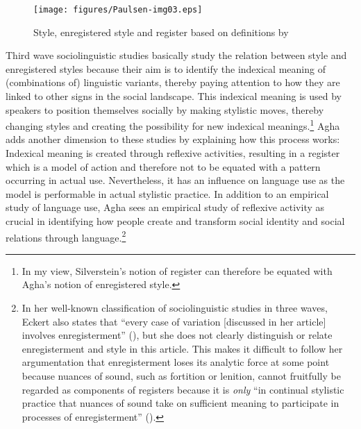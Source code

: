 

\begin{figure}
\texttt{[image: figures/Paulsen-img03.eps]}
\caption{Style, enregistered style and register based on definitions by \citet{Agha2007}}
\label{fig:2:3}
\end{figure}


Third wave sociolinguistic studies basically study the relation between style and enregistered styles because their aim is to identify the indexical meaning of (combinations of) linguistic variants, thereby paying attention to how they are linked to other signs in the social landscape. This indexical meaning is used by speakers to position themselves socially by making stylistic moves, thereby changing styles and creating the possibility for new indexical meanings.\footnote{In my view, Silverstein’s notion of register can therefore be equated with Agha’s notion of enregistered style.} Agha adds another dimension to these studies by explaining how this process works: Indexical meaning is created through reflexive activities, resulting in a register which is a model of action and therefore not to be equated with a pattern occurring in actual use. Nevertheless, it has an influence on language use as the model is performable in actual stylistic practice. In addition to an empirical study of language use, Agha sees an empirical study of reflexive activity as crucial in identifying how people create and transform social identity and social relations through language.\footnote{In her well-known classification of sociolinguistic studies in three waves, Eckert also states that “every case of variation [discussed in her article] involves enregisterment” (\citeyear[96]{Eckert2012}), but she does not clearly distinguish or relate enregisterment and style in this article. This makes it difficult to follow her argumentation that enregisterment loses its analytic force at some point because nuances of sound, such as fortition or lenition, cannot fruitfully be regarded as components of registers because it is \textit{only} “in continual stylistic practice that nuances of sound take on sufficient meaning to participate in processes of enregisterment” (\citeyear[97]{Eckert2012}).}


